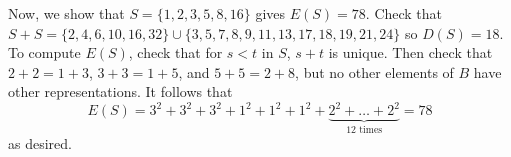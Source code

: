 Now, we show that $S=\{1,2,3,5,8,16\}$ gives $E(S)=78$. Check that $S+S=\{2,4,6,10,16,32\}\cup\{3,5,7,8,9,11,13,17,18,19,21,24\}$ so $D(S)=18$. To compute $E(S)$, check that for $s<t$ in $S$, $s+t$ is unique. Then check that $2+2=1+3$, $3+3=1+5$, and $5+5=2+8$, but no other elements of $B$ have other representations. It follows that
\[
	E(S) = 3^2+3^2+3^2+1^2+1^2+1^2+\underbrace{2^2+\dots+2^2}_{\text{$12$ times}} = 78
\]
as desired.